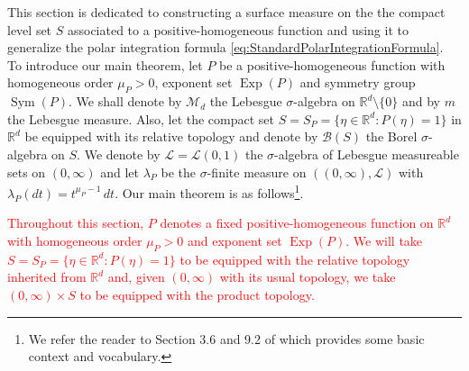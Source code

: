 \documentclass[11pt]{article}
\newcommand\Sym{\operatorname{Sym}}
\newcommand\Exp{\operatorname{Exp}}
\begin{document}
This section is dedicated to constructing a surface measure on the the compact level set $S$ associated to a positive-homogeneous function and using it to generalize the polar integration formula \eqref{eq:StandardPolarIntegrationFormula}. To introduce our main theorem, let $P$ be a positive-homogeneous function with homogeneous order $\mu_P>0$, exponent set $\Exp(P)$ and symmetry group $\Sym(P)$. We shall denote by $\mathcal{M}_d$ the Lebesgue $\sigma$-algebra on $\mathbb{R}^d\setminus\{0\}$ and by $m$ the Lebesgue measure.  Also, let the compact set $S=S_P=\{\eta\in\mathbb{R}^d:P(\eta)=1\}$ in $\mathbb{R}^d$ be equipped with its relative topology and denote by $\mathcal{B}(S)$ the Borel $\sigma$-algebra on $S$. We denote by $\mathcal{L}=\mathcal{L}(0,1)$ the $\sigma$-algebra of Lebesgue measureable sets on $(0,\infty)$ and let $\lambda_P$ be the $\sigma$-finite measure on $((0,\infty),\mathcal{L})$ with $\lambda_P(dt)=t^{\mu_P-1}\,dt$. Our main theorem is as follows\footnote{We refer the reader to Section 3.6 and 9.2 of \cite{Bogachev2007} which provides some basic context and vocabulary.}. 

\textcolor{red}{\noindent Throughout this section, $P$ denotes a fixed positive-homogeneous function on $\mathbb{R}^d$ with homogeneous order $\mu_P>0$ and exponent set $\Exp(P)$. We will take $S=S_P=\{\eta\in\mathbb{R}^d:P(\eta)=1\}$ to be equipped with the relative topology inherited from $\mathbb{R}^d$ and, given $(0,\infty)$ with its usual topology, we take $(0,\infty)\times S$ to be equipped with the product topology. }
\end{document}
